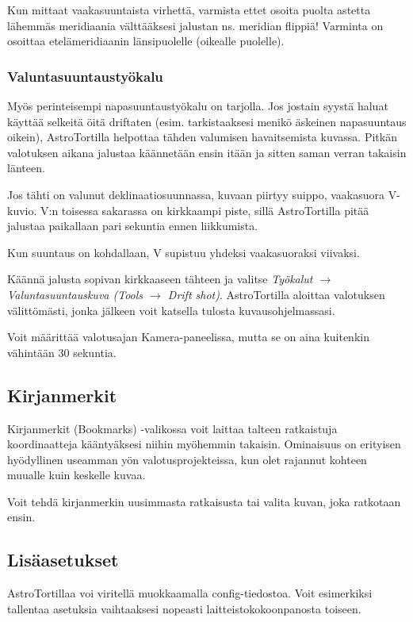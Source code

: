 \documentclass{article}
\begin{document}
Kun mittaat vaakasuuntaista virhettä, varmista ettet osoita puolta astetta
lähemmäs meridiaania välttääksesi jalustan ns. meridian flippiä! Varminta on
osoittaa etelämeridiaanin länsipuolelle (oikealle puolelle).



\subsubsection{Valuntasuuntaustyökalu}

Myös perinteisempi napasuuntaustyökalu on tarjolla. Jos jostain syystä haluat 
käyttää selkeitä öitä driftaten (esim. tarkistaaksesi menikö äskeinen napasuuntaus oikein),
AstroTortilla helpottaa tähden valumisen havaitsemista kuvassa. Pitkän valotuksen aikana jalustaa käännetään ensin itään ja sitten saman verran takaisin länteen.

Jos tähti on valunut deklinaatiosuunnassa, kuvaan piirtyy suippo,
vaakasuora V-kuvio. V:n toisessa sakarassa on kirkkaampi piste, 
sillä AstroTortilla pitää jalustaa paikallaan pari sekuntia ennen liikkumista.

Kun suuntaus on kohdallaan, V supistuu yhdeksi vaakasuoraksi viivaksi.

Käännä jalusta sopivan kirkkaaseen tähteen ja valitse
\emph{Työkalut $\rightarrow$
Valuntasuuntauskuva (Tools $\rightarrow$ Drift shot)}. AstroTortilla aloittaa valotuksen välittömästi, jonka jälkeen voit katsella tulosta
kuvausohjelmassasi.

Voit määrittää valotusajan Kamera-paneelissa, mutta se on aina kuitenkin vähintään 30 sekuntia.

\subsection{Kirjanmerkit}

Kirjanmerkit (Bookmarks) -valikossa voit laittaa talteen ratkaistuja koordinaatteja kääntyäksesi niihin myöhemmin takaisin.
Ominaisuus on erityisen hyödyllinen useamman yön valotusprojekteissa, kun olet rajannut kohteen muualle kuin keskelle kuvaa.

Voit tehdä kirjanmerkin uusimmasta ratkaisusta tai valita kuvan, joka ratkotaan ensin.

\subsection{Lisäasetukset}

AstroTortillaa voi viritellä muokkaamalla config-tiedostoa. Voit esimerkiksi tallentaa asetuksia vaihtaaksesi nopeasti laitteistokokoonpanosta toiseen.
\end{document}
